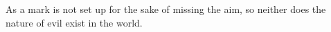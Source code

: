 As a mark is not set up for the sake of missing the aim, so neither
does the nature of evil exist in the world. 
